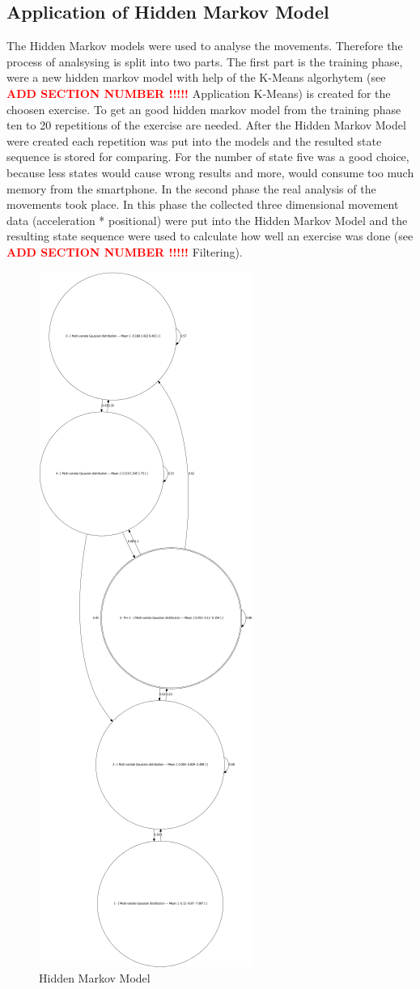 \subsection{Application of Hidden Markov Model}

The Hidden Markov models were used to analyse the movements. Therefore the process of analsysing is split into two parts. The first part is the training phase, were a new hidden markov model with help of the K-Means algorhytem (see  \textcolor{red}{\textbf{ ADD SECTION NUMBER !!!!!}} Application K-Means) is created for the choosen exercise. To get an good hidden markov model from the training phase ten to 20 repetitions of the exercise are needed. After the Hidden Markov Model were created each repetition was put into the models and the resulted state sequence is stored for comparing. For the number of state five was a good choice, because less states would cause wrong results and more, would consume too much memory from the smartphone. In the second phase the real analysis of the movements took place. In this phase the collected three dimensional movement data (acceleration * positional) were put into the Hidden Markov Model and the resulting state sequence were used to calculate how well an exercise was done (see \textcolor{red}{\textbf{ ADD SECTION NUMBER !!!!!}} Filtering).
\begin{figure}[htp]
\centering
\includegraphics[scale=1.00]{00_resources/figures/output.png}
\caption{Hidden Markov Model}
\label{}
\end{figure}
